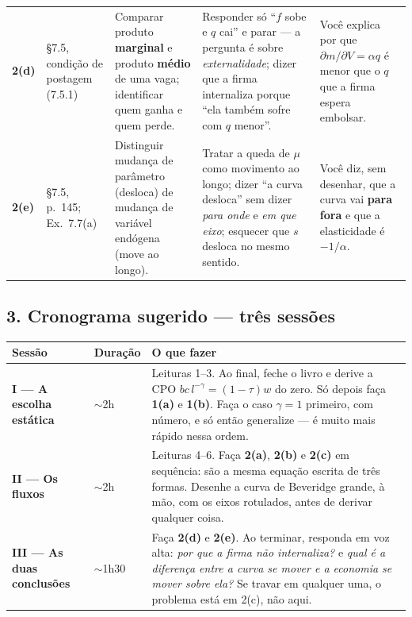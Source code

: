 \documentclass[11pt, a4paper]{article}
\begin{document}
\begin{center}
\begin{tabular}{@{}p{0.8cm}p{2.35cm}p{3.85cm}p{3.95cm}p{3.35cm}@{}}
\textbf{2(d)} & §7.5, condição de postagem (7.5.1)
& Comparar produto \textbf{marginal} e produto \textbf{médio} de uma vaga; identificar
  quem ganha e quem perde.
& Responder só ``$f$ sobe e $q$ cai'' e parar --- a pergunta é sobre \emph{externalidade};
  dizer que a firma internaliza porque ``ela também sofre com $q$ menor''.
& Você explica por que $\partial m/\partial V=\alpha q$ é menor que o $q$ que a firma
  espera embolsar. \\

\textbf{2(e)} & §7.5, p.\ 145; Ex.\ 7.7(a)
& Distinguir mudança de parâmetro (desloca) de mudança de variável endógena (move ao
  longo).
& Tratar a queda de $\mu$ como movimento ao longo; dizer ``a curva desloca'' sem dizer
  \emph{para onde} e \emph{em que eixo}; esquecer que $s$ desloca no mesmo sentido.
& Você diz, sem desenhar, que a curva vai \textbf{para fora} e que a elasticidade é
  $-1/\alpha$. \\
\bottomrule
\end{tabular}
\end{center}

\subsection*{3. Cronograma sugerido --- três sessões}

\begin{center}
\small
\begin{tabular}{@{}llp{9.2cm}@{}}
\toprule
\textbf{Sessão} & \textbf{Duração} & \textbf{O que fazer} \\
\midrule
\textbf{I --- A escolha estática}
& $\sim$2h
& Leituras 1--3. Ao final, feche o livro e derive a CPO $bc\,l^{-\gamma}=(1-\tau)w$ do
  zero. Só depois faça \textbf{1(a)} e \textbf{1(b)}. Faça o caso $\gamma=1$ primeiro,
  com número, e só então generalize --- é muito mais rápido nessa ordem. \\
\textbf{II --- Os fluxos}
& $\sim$2h
& Leituras 4--6. Faça \textbf{2(a)}, \textbf{2(b)} e \textbf{2(c)} em sequência: são a
  mesma equação escrita de três formas. Desenhe a curva de Beveridge grande, à mão, com
  os eixos rotulados, antes de derivar qualquer coisa. \\
\textbf{III --- As duas conclusões}
& $\sim$1h30
& Faça \textbf{2(d)} e \textbf{2(e)}. Ao terminar, responda em voz alta: \emph{por que a
  firma não internaliza?} e \emph{qual é a diferença entre a curva se mover e a economia
  se mover sobre ela?} Se travar em qualquer uma, o problema está em 2(c), não aqui. \\
\bottomrule
\end{tabular}
\end{center}
\end{document}
